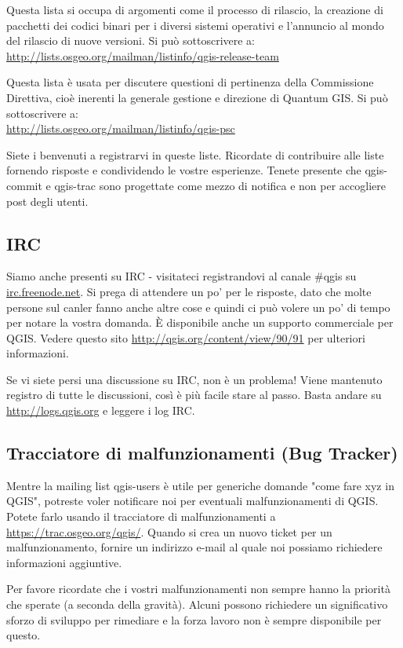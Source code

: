 Questa lista si occupa di argomenti come il processo di rilascio, la creazione di pacchetti dei codici binari per i diversi sistemi operativi e l'annuncio al mondo del rilascio di nuove versioni. Si può sottoscrivere a:\\
\url{http://lists.osgeo.org/mailman/listinfo/qgis-release-team}

Questa lista è usata per discutere questioni di pertinenza della Commissione Direttiva, cioè inerenti la generale gestione e direzione di Quantum GIS. Si può sottoscrivere a:\\
\url{http://lists.osgeo.org/mailman/listinfo/qgis-psc}

Siete i benvenuti a registrarvi in queste liste. Ricordate di contribuire alle liste fornendo risposte e condividendo le vostre esperienze. Tenete presente che qgis-commit e qgis-trac sono progettate come mezzo di notifica e non per accogliere post degli utenti. 

\subsection{IRC}
Siamo anche presenti su IRC - visitateci registrandovi al canale \#qgis su
\url{irc.freenode.net}. Si prega di attendere un po' per le risposte, dato che molte persone sul canler fanno anche altre cose e quindi ci può volere un po' di tempo per notare la vostra domanda. È disponibile anche un supporto commerciale per QGIS. Vedere questo sito \url{http://qgis.org/content/view/90/91} per ulteriori informazioni.

Se vi siete persi una discussione su IRC, non è un problema! Viene mantenuto registro di tutte le discussioni, così è più facile stare al passo. Basta andare su \url{http://logs.qgis.org} e leggere i log IRC.

\subsection{Tracciatore di malfunzionamenti (Bug Tracker)}
Mentre la mailing list qgis-users è utile per generiche domande "come fare xyz in
QGIS", potreste voler notificare noi per eventuali malfunzionamenti di QGIS. Potete farlo usando il tracciatore di malfunzionamenti a \url{https://trac.osgeo.org/qgis/}. Quando si crea un nuovo ticket per un malfunzionamento, fornire un indirizzo e-mail al quale noi possiamo richiedere informazioni aggiuntive.

Per favore ricordate che i vostri malfunzionamenti non sempre hanno la priorità che sperate (a seconda della gravità). Alcuni possono richiedere un significativo sforzo di sviluppo per rimediare e la forza lavoro non è sempre disponibile per questo.

